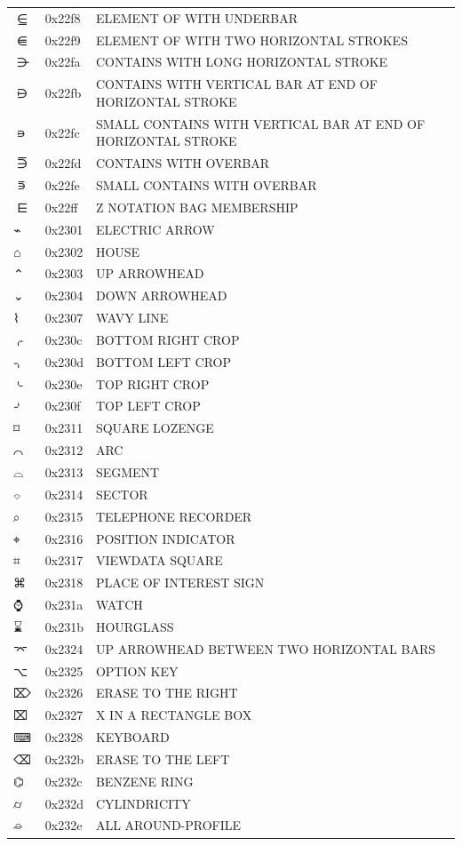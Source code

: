 \documentclass[12pt, twoside]{article}
\begin{document}
\begin{longtable}{L{1.0cm} L{2.0cm} >{\footnotesize}L{10cm}}
$⋸$&0x22f8&ELEMENT OF WITH UNDERBAR\\
$⋹$&0x22f9&ELEMENT OF WITH TWO HORIZONTAL STROKES\\
$⋺$&0x22fa&CONTAINS WITH LONG HORIZONTAL STROKE\\
$⋻$&0x22fb&CONTAINS WITH VERTICAL BAR AT END OF HORIZONTAL STROKE\\
$⋼$&0x22fc&SMALL CONTAINS WITH VERTICAL BAR AT END OF HORIZONTAL STROKE\\
$⋽$&0x22fd&CONTAINS WITH OVERBAR\\
$⋾$&0x22fe&SMALL CONTAINS WITH OVERBAR\\
$⋿$&0x22ff&Z NOTATION BAG MEMBERSHIP\\
$⌁$&0x2301&ELECTRIC ARROW\\
$⌂$&0x2302&HOUSE\\
$⌃$&0x2303&UP ARROWHEAD\\
$⌄$&0x2304&DOWN ARROWHEAD\\
$⌇$&0x2307&WAVY LINE\\
$⌌$&0x230c&BOTTOM RIGHT CROP\\
$⌍$&0x230d&BOTTOM LEFT CROP\\
$⌎$&0x230e&TOP RIGHT CROP\\
$⌏$&0x230f&TOP LEFT CROP\\
$⌑$&0x2311&SQUARE LOZENGE\\
$⌒$&0x2312&ARC\\
$⌓$&0x2313&SEGMENT\\
$⌔$&0x2314&SECTOR\\
$⌕$&0x2315&TELEPHONE RECORDER\\
$⌖$&0x2316&POSITION INDICATOR\\
$⌗$&0x2317&VIEWDATA SQUARE\\
$⌘$&0x2318&PLACE OF INTEREST SIGN\\
$⌚$&0x231a&WATCH\\
$⌛$&0x231b&HOURGLASS\\
$⌤$&0x2324&UP ARROWHEAD BETWEEN TWO HORIZONTAL BARS\\
$⌥$&0x2325&OPTION KEY\\
$⌦$&0x2326&ERASE TO THE RIGHT\\
$⌧$&0x2327&X IN A RECTANGLE BOX\\
$⌨$&0x2328&KEYBOARD\\
$⌫$&0x232b&ERASE TO THE LEFT\\
$⌬$&0x232c&BENZENE RING\\
$⌭$&0x232d&CYLINDRICITY\\
$⌮$&0x232e&ALL AROUND-PROFILE\\

\end{longtable}
\end{document}
